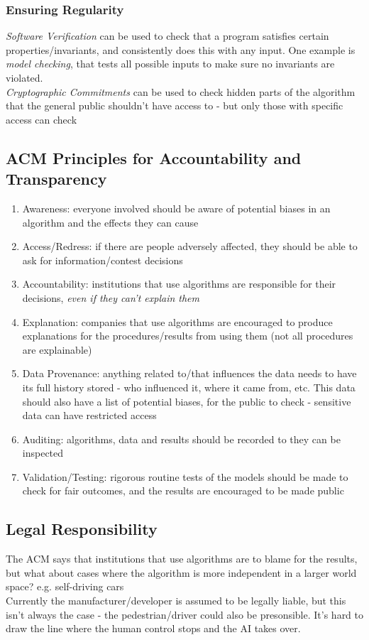 \subsubsection{Ensuring Regularity}
\emph{Software Verification} can be used to check that a program satisfies certain properties/invariants, and consistently does this with any input. One example is \emph{model checking}, that tests all possible inputs to make sure no invariants are violated.\\
\emph{Cryptographic Commitments} can be used to check hidden parts of the algorithm that the general public shouldn't have access to - but only those with specific access can check

\subsection{ACM Principles for Accountability and Transparency}
\begin{enumerate}
    \item Awareness: everyone involved should be aware of potential biases in an algorithm and the effects they can cause
    \item Access/Redress: if there are people adversely affected, they should be able to ask for information/contest decisions
    \item Accountability: institutions that use algorithms are responsible for their decisions, \emph{even if they can't explain them}
    \item Explanation: companies that use algorithms are encouraged to produce explanations for the procedures/results from using them (not all procedures are explainable)
    \item Data Provenance: anything related to/that influences the data needs to have its full history stored - who influenced it, where it came from, etc. This data should also have a list of potential biases, for the public to check - sensitive data can have restricted access
    \item Auditing: algorithms, data and results should be recorded to they can be inspected
    \item Validation/Testing: rigorous routine tests of the models should be made to check for fair outcomes, and the results are encouraged to be made public
\end{enumerate}

\subsection{Legal Responsibility}
The ACM says that institutions that use algorithms are to blame for the results, but what about cases where the algorithm is more independent in a larger world space? e.g. self-driving cars \\
Currently the manufacturer/developer is assumed to be legally liable, but this isn't always the case - the pedestrian/driver could also be presonsible. It's hard to draw the line where the human control stops and the AI takes over.

